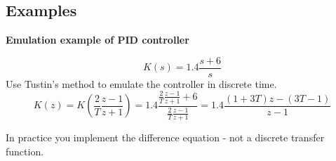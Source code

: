 \subsection{Examples}

\textbf{Emulation example of PID controller}

$$K(s) = 1.4 \frac{s+6}{s}$$
Use Tustin's method to emulate the controller in discrete time.
$$K(z) = K(\frac{2}{T} \frac{z-1}{z+1}) = 1.4 \frac{\frac{2}{T} \frac{z-1}{z+1}+6}{\frac{2}{T} \frac{z-1}{z+1}}
	= 1.4 \frac{(1+3T)z-(3T-1)}{z-1}$$

In practice you implement the difference equation - not a discrete transfer function.
